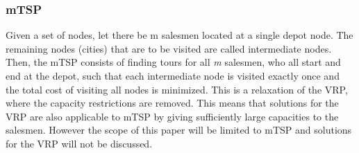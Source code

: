 \documentclass[11pt]{article}
\begin{document}
\subsubsection{mTSP}
Given a set of nodes, let there be m salesmen located at a single depot node. The remaining nodes (cities) that are to be visited are called intermediate nodes. Then, the mTSP consists of finding tours for all \textit{m} salesmen, who all start and end at the depot, such that each intermediate node is visited exactly once and the total cost of visiting all nodes is minimized. This is a relaxation of the VRP, where the capacity restrictions are removed. This means that solutions for the VRP are also applicable to mTSP by giving sufficiently large capacities to the salesmen. However the scope of this paper will be limited to mTSP and solutions for the VRP will not be discussed.
\end{document}
